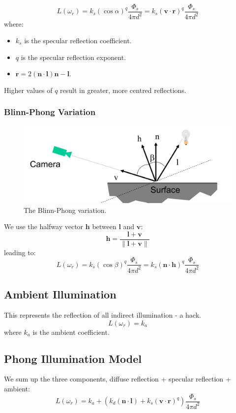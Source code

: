 \documentclass[11pt]{article}
\begin{document}
\[
  L(\omega_r) = k_s(\cos \alpha)^q \frac{\Phi_s}{4\pi d^2} = k_s (\bm{v} \cdot \bm{r})^q \frac{\Phi_s}{4\pi d^2} 
\]
where:
\begin{itemize}
  \item $k_s$ is the specular reflection coefficient.
  \item $q$ is the specular reflection exponent.
  \item $\bm{r} = 2(\bm{n} \cdot \bm{l}) \bm{n} - \bm{l}$.
\end{itemize}

Higher values of $q$ result in greater, more centred reflections.

\subsubsection{Blinn-Phong Variation}
\begin{figure}[htb!]
  \centering
  \caption{The Blinn-Phong variation.}
  \includegraphics[scale=0.3]{blinnphong}
\end{figure}
We use the halfway vector $\bm{h}$ between $\bm{l}$ and $\bm{v}$:
\[
  \bm{h} = \frac{\bm{l} + \bm{v}}{\lVert \bm{l} + \bm{v} \rVert} 
\]
leading to:
\[
  L(\omega_r) = k_s(\cos \beta)^q \frac{\Phi_s}{4\pi d^2} = k_s (\bm{n} \cdot \bm{h})^q \frac{\Phi_s}{4\pi d^2} 
\]

\subsection{Ambient Illumination}
This represents the reflection of all indirect illumination - a hack.
\[
  L(\omega_r) = k_a 
\]
where $k_a$ is the ambient coefficient.

\subsection{Phong Illumination Model}
We sum up the three components, diffuse reflection + specular reflection + ambient:
\[
  L(\omega_r) = k_a + (k_d (\bm{n} \cdot \bm{l}) + k_s (\bm{v} \cdot \bm{r})^q) \frac{\Phi_s}{4\pi d^2} 
\]
\end{document}
